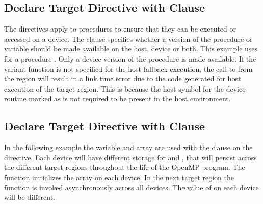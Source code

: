

\subsection{Declare Target Directive with  Clause}
\label{subsec:declare_target_device_type}




The  directives apply to procedures to ensure that they can be executed or accessed on a device.
The  clause specifies whether a version of the procedure or variable should be made available on the host, device or both. 
This example uses  for a procedure . Only a device version of the procedure  is made available. 
If the variant function  is not specified for the host fallback execution, the call to  from the  region will result in a link time error due to the code generated for host execution of the target region.
This is because the host symbol for the device routine  marked as  is not required to be present in the host environment.


\subsection{Declare Target Directive with  Clause}
\label{subsec:declare_target_local}




In the following example the variable  and array  are used with the  clause 
on the  directive. Each device will have different storage for  and
, that will persist across the different target regions throughout the life of the OpenMP program. 
The function  initializes the array on each device. In the next target region the function  is invoked 
asynchronously across all devices. The value of  on each device will be different.

